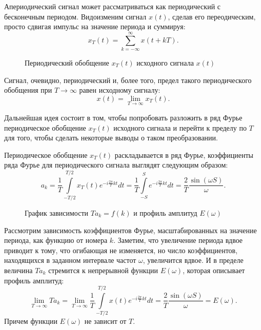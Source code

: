 Апериодический сигнал может рассматриваться как периодический с бесконечным периодом.
Видоизменим сигнал $x(t)$, сделав его переодическим, просто сдвигая импульс на значение периода и суммируя:
$$x_T(t) = \sum \limits _{k=-\infty}^{\infty} x(t+kT) .$$
\begin{figure}[!htb]
\caption{Периодический обобщение $x_T(t)$ исходного сигнала $x(t)$}
\end{figure}

Сигнал, очевидно, периодический и, более того, предел такого периодического обобщения при $T\to \infty$ равен исходному сигналу:
$$x(t) = \lim \limits _{T \to \infty} x_T(t).$$

Дальнейшая идея состоит в том, чтобы попробовать разложить в ряд Фурье периодическое обобщение $x_T(t)$ исходного сигнала и перейти к пределу по $T$ для того, чтобы сделать некоторые выводы о таком преобразовании.

Периодическое обобщение $x_T(t)$ раскладывается в ряд Фурье, коэффициенты ряда Фурье для периодического сигнала выглядят следующим образом:
$$a_k = \frac{1}{T} \int \limits_{-T/2}^{T/2} x_T(t) e^{-i \frac{2\pi}{T}kt} dt = \frac{1}{T} \int \limits_{-S}^{S} e^{-i \frac{2\pi}{T}kt} dt = \frac{2}{T} \frac{\sin(\omega S)}{\omega}.$$
\begin{figure}[!htb]
\caption{График зависимости $T a_k = f(k)$ и профиль амплитуд $E(\omega)$}
\end{figure}

Рассмотрим зависимость коэффициентов Фурье, масштабированных на значение периода, как функцию от номера $k$. Заметим, что увеличение периода вдвое приводит к тому, что огибающая не изменяется, но число коэффициентов, находящихся в заданном интервале частот $\omega$, увеличится вдвое. И в пределе величина $T a_k$ стремится к непрерывной функции $E(\omega)$, которая описывает профиль амплитуд:
$$\lim \limits_{T\to \infty}T a_k = \lim \limits_{T\to \infty} \frac{1}{T} \int \limits_{-T/2}^{T/2} x(t) e^{-i \frac{2\pi}{T}kt} dt = \frac{2}{T} \frac{\sin(\omega S)}{\omega} = E(\omega).$$
Причем функции $E(\omega)$ не зависит от $T$.

